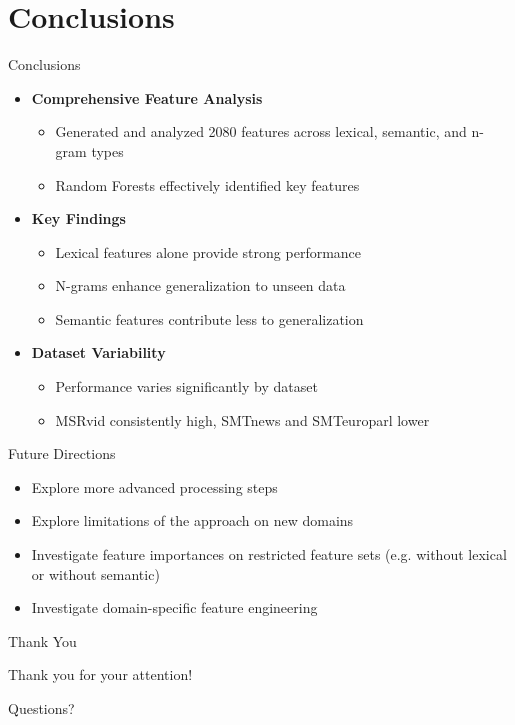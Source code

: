 \documentclass{beamer}
\begin{document}
\section{Conclusions}
\begin{frame}{Conclusions}
    \begin{itemize}
        \item \textbf{Comprehensive Feature Analysis}
        \begin{itemize}
            \item Generated and analyzed 2080 features across lexical, semantic, and n-gram types
            \item Random Forests effectively identified key features
        \end{itemize}
        \item \textbf{Key Findings}
        \begin{itemize}
            \item Lexical features alone provide strong performance
            \item N-grams enhance generalization to unseen data
            \item Semantic features contribute less to generalization
        \end{itemize}
        \item \textbf{Dataset Variability}
        \begin{itemize}
            \item Performance varies significantly by dataset
            \item MSRvid consistently high, SMTnews and SMTeuroparl lower
        \end{itemize}
    \end{itemize}
\end{frame}

\begin{frame}{Future Directions}
    \begin{itemize}
        \item Explore more advanced processing steps
        \item Explore limitations of the approach on new domains
        \item Investigate feature importances on restricted feature sets (e.g. without lexical or without semantic)
        \item Investigate domain-specific feature engineering
    \end{itemize}
\end{frame}

\begin{frame}{Thank You}
    \begin{center}
        \vspace{2em}
        \Large Thank you for your attention!
        \vspace{2em}
        
        Questions?
    \end{center}
\end{frame}
\end{document}
